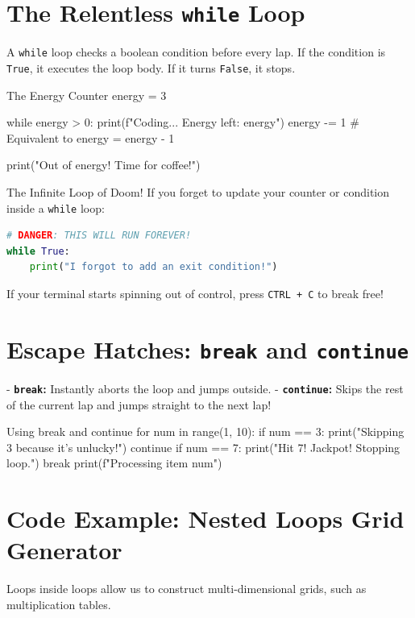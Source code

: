 \section{The Relentless \texttt{while} Loop}

A \texttt{while} loop checks a boolean condition before every lap. If the condition is \texttt{True}, it executes the loop body. If it turns \texttt{False}, it stops.

\begin{pycode}{The Energy Counter}
energy = 3

while energy > 0:
    print(f"Coding... Energy left: {energy}")
    energy -= 1  # Equivalent to energy = energy - 1

print("Out of energy! Time for coffee!")
\end{pycode}

\begin{viperpitfall}{The Infinite Loop of Doom!}
If you forget to update your counter or condition inside a \texttt{while} loop:
\begin{lstlisting}[language=Python]
# DANGER: THIS WILL RUN FOREVER!
while True:
    print("I forgot to add an exit condition!")
\end{lstlisting}
If your terminal starts spinning out of control, press \texttt{CTRL + C} to break free!
\end{viperpitfall}

\section{Escape Hatches: \texttt{break} and \texttt{continue}}

- \textbf{\texttt{break}:} Instantly aborts the loop and jumps outside.
- \textbf{\texttt{continue}:} Skips the rest of the current lap and jumps straight to the next lap!

\begin{pycode}{Using break and continue}
for num in range(1, 10):
    if num == 3:
        print("Skipping 3 because it's unlucky!")
        continue
    if num == 7:
        print("Hit 7! Jackpot! Stopping loop.")
        break
    print(f"Processing item {num}")
\end{pycode}

\section{Code Example: Nested Loops Grid Generator}

Loops inside loops allow us to construct multi-dimensional grids, such as multiplication tables.

